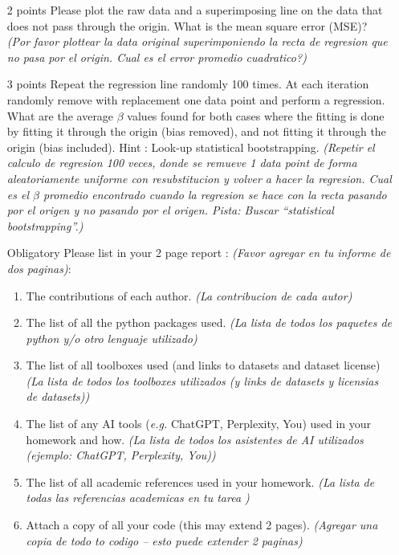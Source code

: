 \documentclass{article}
\begin{document}
\begin{enumerate}
\item [2 points] Please plot the raw data and a superimposing line on the data that does not pass through the origin. What is the mean square error (MSE)? \textit{(Por favor plottear la data original superimponiendo la recta de regresion que no pasa por el origin. Cual es el error promedio cuadratico?)}

\item [3 points] Repeat the regression line randomly 100 times. At each iteration randomly remove with replacement one data point and perform a regression. What are the average $\beta$ values found for both cases where the fitting is done by fitting it through the origin (bias removed), and not fitting it through the origin (bias included). Hint : Look-up statistical bootstrapping. \textit{(Repetir el calculo de regresion 100 veces, donde se remueve 1 data point de forma aleatoriamente uniforme con resubstitucion y volver a hacer la regresion. Cual es el $\beta$ promedio encontrado cuando la regresion se hace con la recta pasando por el origen y no pasando por el origen. Pista: Buscar ``statistical bootstrapping''.)}

\item [Obligatory] Please list in your 2 page report : \textit{(Favor agregar en tu informe de dos paginas)}:
\begin{enumerate}
\item The contributions of each author. \textit{(La contribucion de cada autor)}
\item The list of all the python packages used. \textit{(La lista de todos los paquetes de python y/o otro lenguaje utilizado)}
\item The list of all toolboxes used (and links to datasets and dataset license) \textit{(La lista de todos los toolboxes utilizados (y links de datasets y licensias de datasets))}
\item The list of any AI tools (\textit{e.g.} ChatGPT, Perplexity, You) used in your homework and how. \textit{(La lista de todos los asistentes de AI utilizados (ejemplo: ChatGPT, Perplexity, You))}
\item The list of all academic references used in your homework. \textit{(La lista de todas las referencias academicas en tu tarea )}
\item Attach a copy of all your code (this may extend 2 pages). \textit{(Agregar una copia de todo to codigo -- esto puede extender 2 paginas)}
\end{enumerate}
\end{enumerate}
\end{document}
